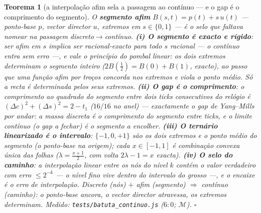 \documentclass[11pt,a4paper]{article}
\newtheorem{teorema}{Teorema}
\newcommand{\code}[1]{\texttt{\small #1}}
\begin{document}
\begin{teorema}[a interpolação afim sela a passagem ao contínuo --- e o
gap é o comprimento do segmento]\label{thm:batuta-continuo}
O \textbf{segmento afim} $B(s,t)=p(t)+s\,u(t)$ --- ponto-base $p$,
vector director $u$, extremos em $s\in\{0,1\}$ --- é o selo que
faltava nomear na passagem discreto$\to$contínuo.
\textbf{(i) O segmento é exacto e rígido}: ser afim em $s$ implica
ser racional-exacto para todo $s$ racional --- o contínuo entra
\emph{sem erro} ---, e vale o \emph{princípio do pombal linear}: os
dois extremos determinam o segmento inteiro
($2B(\tfrac12)=B(0)+B(1)$, exacto), ao passo que uma função
\emph{afim por troços} concorda nos extremos e viola o ponto médio.
Só a recta é determinada pelos seus extremos.
\textbf{(ii) O gap é o comprimento}: o comprimento ao quadrado do
segmento entre dois ticks consecutivos do relógio é
$(\Delta c)^{2}+(\Delta s)^{2}=2-t_{1}$ ($16/16$ no anel) ---
\emph{exactamente} o gap de Yang--Mills por andar: a massa discreta
\emph{é} o comprimento do segmento entre ticks, e o limite contínuo
(o gap a fechar) é o segmento a encolher.
\textbf{(iii) O ternário linearizado é o intervalo}: $\{-1,0,+1\}$
são os dois extremos e o ponto médio do segmento (o ponto-base na
origem); cada $x\in[-1,1]$ é combinação convexa \emph{única} das
folhas ($\lambda=\tfrac{x+1}{2}$, com volta $2\lambda-1=x$ exacta).
\textbf{(iv) O selo do caminho}: a interpolação linear entre os nós
do nível $k$ contém o valor verdadeiro com erro $\le 2^{-k}$ --- o
nível fino vive dentro do intervalo do grosso ---, e o encaixe é
\emph{o erro de interpolação}. Discreto (nós) $+$ afim (segmento)
$\Rightarrow$ contínuo (caminho): o ponto-base ancora, o vector
director atravessa, os extremos determinam.
\emph{Medido:} \code{tests/batuta\_continuo.js} ($6{:}0$;
$\mathcal{M}$).
$\square$
\end{teorema}
\end{document}

